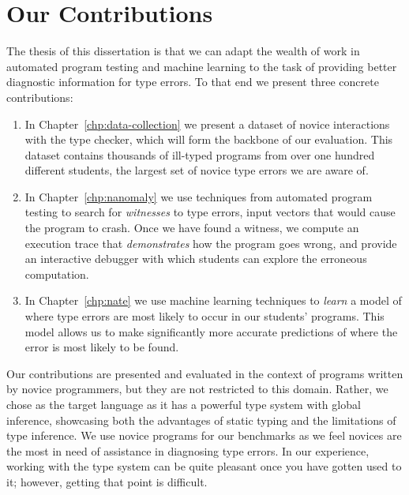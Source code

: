 %



\section{Our Contributions}
\label{sec:our-contributions}

The thesis of this dissertation is that we can adapt the wealth of work
in automated program testing and machine learning to the task of
providing better diagnostic information for type errors.
%
To that end we present three concrete contributions:
%
\begin{enumerate}
\item In Chapter~\ref{chp:data-collection} we present a dataset of
  novice interactions with the \ocaml type checker, which will form the
  backbone of our evaluation.
  This dataset contains thousands of ill-typed programs from over one
  hundred different students, the largest set of novice type errors we
  are aware of.
\item In Chapter~\ref{chp:nanomaly} we use techniques from automated
  program testing to search for \emph{witnesses} to type errors, \ie
  input vectors that would cause the program to crash.
  Once we have found a witness, we compute an execution trace that
  \emph{demonstrates} how the program goes wrong, and provide an
  interactive debugger with which students can explore the erroneous
  computation.

\item In Chapter~\ref{chp:nate} we use machine learning techniques to
  \emph{learn} a model of where type errors are most likely to occur in
  our students' programs.
  This model allows us to make significantly more accurate predictions
  of where the error is most likely to be found.
\end{enumerate}

Our contributions are presented and evaluated in the context of \ocaml
programs written by novice programmers, but they are not restricted to
this domain.
%
Rather, we chose \ocaml as the target language as it has a powerful type
system with global inference, showcasing both the advantages of static
typing and the limitations of type inference.
%
We use novice programs for our benchmarks as we feel novices are the
most in need of assistance in diagnosing type errors.
%
In our experience, working with the type system can be quite pleasant
once you have gotten used to it; however, getting that point is
difficult.
%

